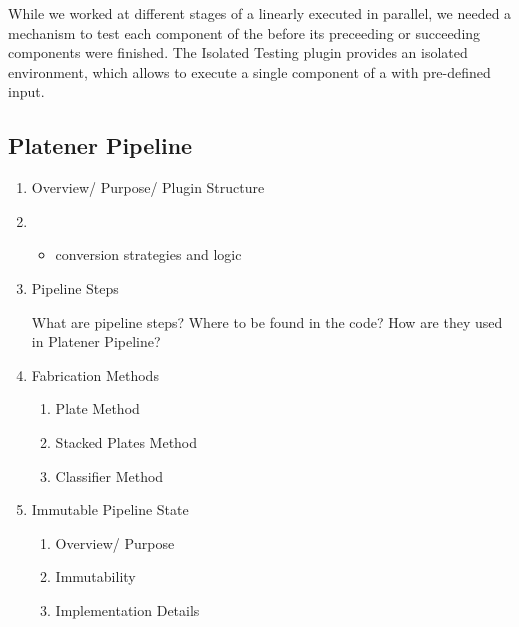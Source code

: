 \documentclass[../ClassicThesis.tex]{subfiles}
\begin{document}
While we worked at different stages of a linearly executed {\fabmethod} in
parallel, we needed a mechanism to test each component of the {\fabmethod}
before its preceeding or succeeding components were finished. The Isolated
Testing plugin provides an isolated environment, which allows to execute a
single component of a {\fabmethod} with pre-defined input.



\subsection{Platener Pipeline}

\begin{enumerate}
\item Overview/ Purpose/ Plugin Structure

\item \begin{itemize}
  \item conversion strategies and logic
  \end{itemize}

\item Pipeline Steps

  What are pipeline steps? Where to be found in the code? How are they used in
  Platener Pipeline?

\item Fabrication Methods


  \begin{enumerate}
  \item Plate Method


  \item Stacked Plates Method


  \item Classifier Method

  \end{enumerate}

\item Immutable Pipeline State


  \begin{enumerate}
  \item Overview/ Purpose


  \item Immutability


  \item Implementation Details

  \end{enumerate}
\end{enumerate}
\end{document}
